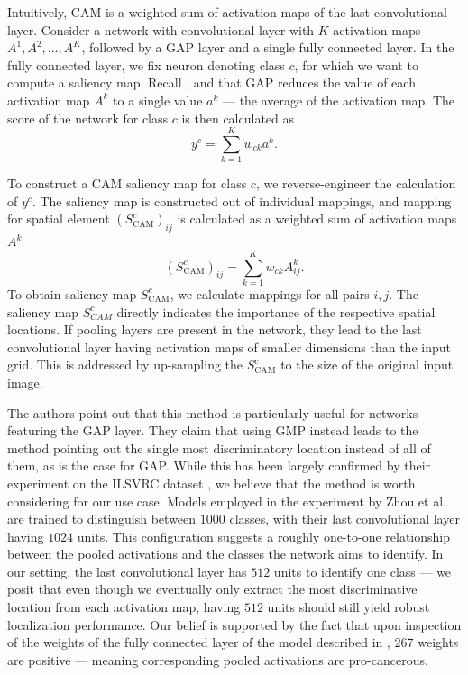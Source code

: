 Intuitively, CAM is a weighted sum of activation maps of the last convolutional layer.
Consider a network with convolutional layer with $K$ activation maps $A^1, A^2, \ldots, A^K$, followed by a GAP layer and a single fully connected layer.
In the fully connected layer, we fix neuron denoting class $c$, for which we want to compute a saliency map.
Recall , and that GAP reduces the value of each activation map $A^k$ to a single value $a^k$ --- the average of the activation map.
The score of the network for class $c$ is then calculated as
\begin{equation}\label{eq:gap-score}
    y^c = \sum_{k=1}^K w_{ck} a^k.
\end{equation}

To construct a CAM saliency map for class $c$, we reverse-engineer the calculation of $y^c$. The saliency map is constructed out of individual mappings, and mapping for spatial element $(S^c_{\text{CAM}})_{ij}$ is calculated as a weighted sum of activation maps $A^k$
\begin{equation}\label{eq:cam}
    (S^c_{\text{CAM}})_{ij} = \sum_{k=1}^K w_{ck}  A^k_{ij}.
\end{equation}
To obtain saliency map $S^c_{\text{CAM}}$, we calculate mappings for all pairs $i, j$.
The saliency map $S^c_{CAM}$ directly indicates the importance of the respective spatial locations.
If pooling layers are present in the network, they lead to the last convolutional layer having activation maps of smaller dimensions than the input grid.
This is addressed by up-sampling the $S^c_{\text{CAM}}$ to the size of the original input image.

The authors point out that this method is particularly useful for networks featuring the GAP layer.
They claim that using GMP instead leads to the method pointing out the single most discriminatory location instead of all of them, as is the case for GAP.
While this has been largely confirmed by their experiment on the ILSVRC dataset \cite{ilsvrc}, we believe that the method is worth considering for our use case.
Models employed in the experiment by Zhou et al. \cite{cam} are trained to distinguish between $1000$ classes, with their last convolutional layer having $1024$ units.
This configuration suggests a roughly one-to-one relationship between the pooled activations and the classes the network aims to identify.
In our setting, the last convolutional layer has $512$ units to identify one class --- we posit that even though we eventually only extract the most discriminative location from each activation map, having $512$ units should still yield robust localization performance.
Our belief is supported by the fact that upon inspection of the weights of the fully connected layer of the model described in , $267$ weights are positive --- meaning corresponding pooled activations are pro-cancerous.

